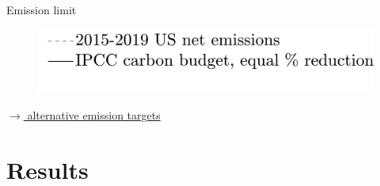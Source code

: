 \documentclass[11pt,aspectratio=169]{beamer}
\begin{document}
\begin{frame}{Emission limit}
\begin{center}
		\begin{minipage}{0.3\textwidth}
			\begin{figure}
				\includegraphics[width=1.4\textwidth]{../codding_model/own_basedOnFried/optimalPol_010922_revision/figures/all_13Sept22_Tplus30/Emnet_goals_o0_lgd1_crop.png}
			\end{figure}
		\end{minipage}
	\end{center}

\vspace{-1.7mm}
\hfill	\hyperlink{emsall}{\tiny{$\rightarrow$ alternative emission targets}}
\end{frame}

	\hypertarget{resback}{}
	\section{Results}
	
\end{document}
